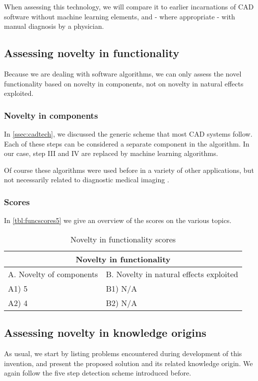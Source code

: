 When assessing this technology, we will compare it to earlier incarnations of
CAD software without machine learning elements, and - where appropriate - with
manual diagnosis by a physician.

\subsection{Assessing novelty in functionality}
Because we are dealing with software algorithms, we can only assess the novel
functionality based on novelty in components, not on novelty in natural effects
exploited. 

\subsubsection{Novelty in components}
In \autoref{ssec:cadtech}, we discussed the generic scheme that most CAD systems
follow. Each of these steps can be considered a separate component in the
algorithm. In our case, step III and IV are replaced by machine learning
algorithms.

Of course these algorithms were used before in a variety of other applications,
but not necessarily related to diagnostic medical imaging
\cite{machinelearningapps}. 

\subsubsection{Scores}
In \autoref{tbl:funcscores5} we give an overview of the scores on the various
topics.

\begin{table}[h]
\centering
\begin{tabular}{l l}
\hline
\multicolumn{2}{|c|}{Novelty in functionality} \\
\hline
A. Novelty of components & B. Novelty in natural effects exploited\\
A1) 5 & B1) N/A\\ 
A2) 4 & B2) N/A\\ 
\hline
\end{tabular}
\caption{Novelty in functionality scores}
\label{tbl:funcscores5}
\end{table}

\subsection{Assessing novelty in knowledge origins}
As usual, we start by listing problems encountered during development of this
invention, and present the proposed solution and its related knowledge origin.
We again follow the five step detection scheme introduced before. 

